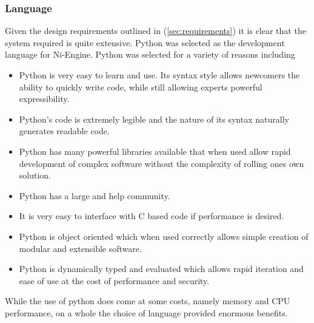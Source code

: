\subsubsection{Language}
Given the design requirements outlined in (\ref{sec:requirements}) it is clear that the system required is quite extensive. Python\cite{python} was selected as the development language for Ni-Engine. Python was selected for a variety of reasons including 
\begin{itemize}
\item Python is very easy to learn and use. Its syntax style allows newcomers the ability to quickly write code, while still allowing experts powerful expressibility. 
\item Python's code is extremely legible and the nature of its syntax naturally generates readable code. 
\item Python has many powerful libraries available that when used allow rapid development of complex software without the complexity of rolling ones own solution. 
\item Python has a large and help community. 
\item It is very easy to interface with C based code if performance is desired. 
\item Python is object oriented which when used correctly allows simple creation of modular and extensible software. 
\item Python is dynamically typed and evaluated which allows rapid iteration and ease of use at the cost of performance and security. 
\end{itemize}
While the use of python does come at some costs, namely memory and CPU performance, on a whole the choice of language provided enormous benefits.

